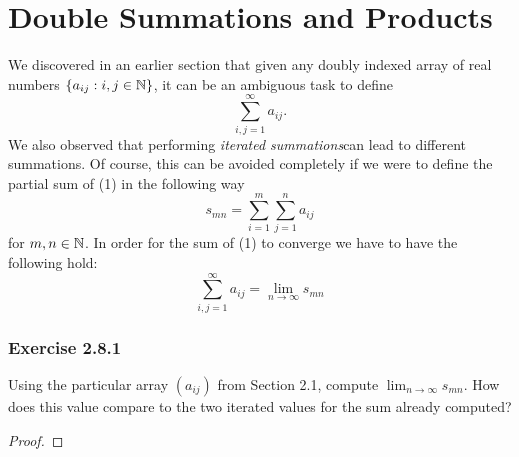
\section{Double Summations and Products}

We discovered in an earlier section that given any doubly indexed array of real numbers \( \{  a_{ij} : i,j \in \mathbb{N}  \}\), it can be an ambiguous task to define 
\[ \sum_{i,j = 1}^{\infty} a_{ij}. \tag{1}\]
We also observed that performing \textit{iterated summations}can lead to different summations. Of course, this can be avoided completely if we were to define the partial sum of (1) in the following way 
\[ s_{mn} =  \sum_{i=1}^{m} \sum_{j=1}^{n} a_{ij}\]
for \( m, n \in \mathbb{N} \). In order for the sum of (1) to converge we have to have the following hold:
\[ \sum_{i,j = 1 }^{\infty} a_{ij} = \lim_{n \to \infty} s_{mn}\]

\subsubsection{Exercise 2.8.1} Using the particular array \( (a_{ij})\) from Section 2.1, compute \( \lim_{n \to \infty} s_{mn}\). How does this value compare to the two iterated values for the sum already computed?  
\begin{proof}

\end{proof}



